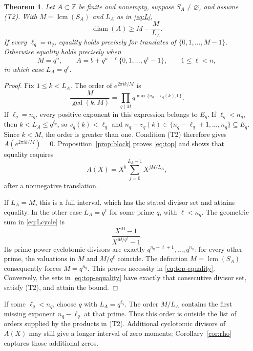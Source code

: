 \documentclass[11pt]{article}
\newtheorem{theorem}{Theorem}[section]
\theoremstyle{definition}
\theoremstyle{remark}
\numberwithin{equation}{section}
\DeclareMathOperator{\diam}{diam}
\DeclareMathOperator{\lcm}{lcm}
\newcommand{\Z}{\mathbb Z}
\begin{document}
\begin{theorem}\label{thm:top}
Let $A\subset\Z$ be finite and nonempty, suppose $S_A\ne\varnothing$, and assume
(T2). With $M=\lcm(S_A)$ and $L_A$ as in \eqref{eq:L},
\begin{equation}\label{eq:top}
 \diam(A)\ge M-\frac{M}{L_A}.
\end{equation}
If every $\ell_q=n_q$, equality holds precisely for translates of
$\{0,1,\ldots,M-1\}$. Otherwise equality holds precisely when
\begin{equation}\label{eq:top-equality}
 M=q^n,\qquad
 A=b+q^{n-\ell}\{0,1,\ldots,q^\ell-1\},
 \qquad 1\le\ell<n,
\end{equation}
in which case $L_A=q^\ell$.
\end{theorem}

\begin{proof}
Fix $1\le k<L_A$. The order of $e^{2\pi ik/M}$ is
\[
 \frac{M}{\gcd(k,M)}
 =\prod_{q\mid M}q^{\max\{n_q-v_q(k),0\}}.
\]
If $\ell_q=n_q$, every positive exponent in this expression belongs to
$E_q$. If $\ell_q<n_q$, then $k<L_A\le q^{\ell_q}$, so
$v_q(k)<\ell_q$ and
$n_q-v_q(k)\in\{n_q-\ell_q+1,\ldots,n_q\}\subseteq E_q$.
Since $k<M$, the order is greater than one. Condition (T2) therefore
gives $A(e^{2\pi ik/M})=0$. Proposition~\ref{prop:block} proves
\eqref{eq:top} and shows that equality requires
\begin{equation}\label{eq:Lcycle}
 A(X)=X^b\sum_{j=0}^{L_A-1}X^{jM/L_A},
\end{equation}
after a nonnegative translation.

If $L_A=M$, this is a full interval, which has the stated divisor set
and attains equality. In the other case $L_A=q^\ell$ for some prime
$q$, with $\ell<n_q$. The geometric sum in \eqref{eq:Lcycle} is
\[
 \frac{X^M-1}{X^{M/q^\ell}-1}.
\]
Its prime-power cyclotomic divisors are exactly
$q^{n_q-\ell+1},\ldots,q^{n_q}$: for every other prime, the valuations
in $M$ and $M/q^\ell$ coincide. The definition $M=\lcm(S_A)$ consequently
forces $M=q^{n_q}$. This proves necessity in \eqref{eq:top-equality}.
Conversely, the sets in \eqref{eq:top-equality} have exactly that
consecutive divisor set, satisfy (T2), and attain the bound.
\end{proof}

If some $\ell_q<n_q$, choose $q$ with $L_A=q^{\ell_q}$.
The order $M/L_A$ contains the first missing exponent
$n_q-\ell_q$ at that prime. Thus this order is outside the list of
orders supplied by the products in (T2). Additional cyclotomic
divisors of $A(X)$ may still give a longer interval of zero moments;
Corollary~\ref{cor:rho} captures those additional zeros.
\end{document}
